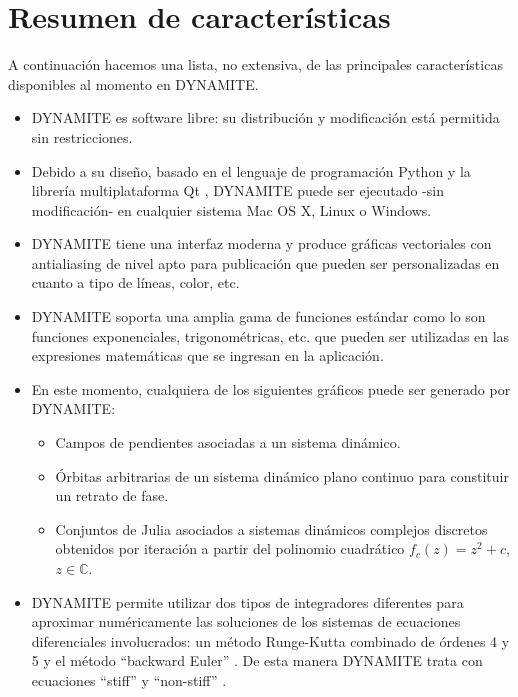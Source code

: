\documentclass[11pt]{book}
\theoremstyle{definition}
\numberwithin{definition}{section}
\theoremstyle{theorem}
\numberwithin{theorem}{section}
\numberwithin{lemma}{section}
\numberwithin{corollary}{section}
\theoremstyle{plain}
\numberwithin{example}{section}
\newcommand{\C}{{\ensuremath{\mathbb{C}}}}
\begin{document}
\section{Resumen de características}

A continuación hacemos una lista, no extensiva, de las principales características disponibles al momento en DYNAMITE.

\begin{itemize}
	\item DYNAMITE es software libre: su distribución y modificación está permitida sin restricciones.
	\item Debido a su diseño, basado en el lenguaje de programación Python \cite{python} y la librería multiplataforma Qt \cite{libqt}, DYNAMITE puede ser ejecutado -sin modificación- en cualquier sistema Mac OS X, Linux o Windows.
	\item DYNAMITE tiene una interfaz moderna y produce gráficas vectoriales con antialiasing \cite{pcmagantialiasing} de nivel apto para publicación que pueden ser personalizadas en cuanto a tipo de líneas, color, etc.
	\item DYNAMITE soporta una amplia gama de funciones estándar como lo son funciones exponenciales, trigonométricas, etc. que pueden ser utilizadas en las expresiones matemáticas que se ingresan en la aplicación.
	\item En este momento, cualquiera de los siguientes gráficos puede ser generado por DYNAMITE:
		\begin{itemize}
			\item Campos de pendientes asociadas a un sistema dinámico.
			\item Órbitas arbitrarias de un sistema dinámico plano continuo para constituir un retrato de fase.
			\item Conjuntos de Julia \cites{complexdynamics,milnorcomplex} asociados a sistemas dinámicos complejos discretos obtenidos por iteración a partir del polinomio cuadrático $f_c(z) = z^2 + c$, $z \in \C$.
		\end{itemize}
	\item DYNAMITE permite utilizar dos tipos de integradores diferentes para aproximar numéricamente las soluciones de los sistemas de ecuaciones diferenciales involucrados: un método Runge-Kutta combinado de órdenes 4 y 5 \cites[p.~518]{analisisnumerico}{fehlberg} y el método ``backward Euler'' \cites[p.~584]{analisisnumerico}{butcher}. De esta manera DYNAMITE  trata con ecuaciones ``stiff'' \cites{stiff}[p.~583]{analisisnumerico} y ``non-stiff'' \cite{nonstiff}.
\end{itemize}
\end{document}
